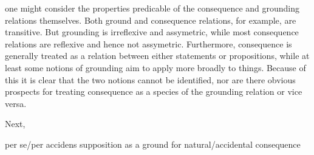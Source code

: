 one might consider the properties predicable of the consequence and grounding relations themselves. Both ground and consequence relations, for example, are transitive. But grounding is irreflexive and assymetric, while most consequence relations are reflexive and hence not assymetric. Furthermore, consequence is generally treated as a relation between either statements or propositions, while at least some notions of grounding aim to apply more broadly to things. Because of this it is clear that the two notions cannot be identified, nor are there obvious prospects for treating consequence as a species of the grounding relation or vice versa.

Next, 

per se/per accidens supposition as a ground for natural/accidental consequence
